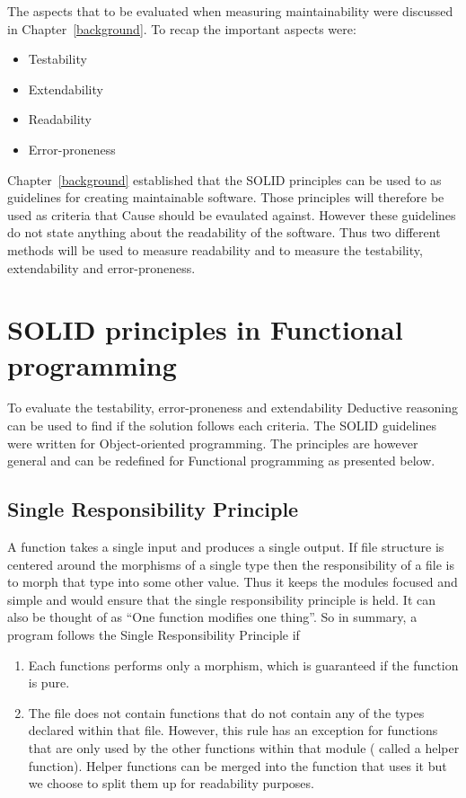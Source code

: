 The aspects that to be evaluated when measuring maintainability were discussed
in Chapter~\ref{background}. To recap the important aspects were:

\begin{itemize}
    \item Testability
    \item Extendability
    \item Readability
    \item Error-proneness
\end{itemize}

Chapter~\ref{background} established that the SOLID principles can be used to
as guidelines for creating maintainable software. Those principles will
therefore be used as criteria that Cause should be evaulated against.  However
these guidelines do not state anything about the readability of the software.
Thus two different methods will be used to measure readability and to measure
the testability, extendability and error-proneness.


\section{SOLID principles in Functional programming}\label{dependencyinjection}

To evaluate the testability, error-proneness and extendability  Deductive
reasoning can be used to find if the solution follows each criteria.  The SOLID
guidelines were written for Object-oriented programming. The principles are
however general and can be redefined for Functional programming as presented
below. 

\subsection{Single Responsibility Principle}

A function takes a single input and produces a single output. If file structure
is centered around the morphisms of a single type then the responsibility of a
file is to morph that type into some other value. Thus it keeps the modules
focused and simple and would ensure that the single responsibility principle is
held. It can also be thought of as ``One function modifies one thing''. So in
summary, a program follows the Single Responsibility Principle if 

\begin{enumerate}
    \item Each functions performs only a morphism, which is guaranteed if the function
        is pure.
	\item The file does not contain functions that do not contain any of the
types declared within that file. However, this rule has an exception for
functions that are only used by the other functions within that module ( called
a helper function). Helper functions can be merged into the function that uses
it but we choose to split them up for readability purposes.
\end{enumerate}

